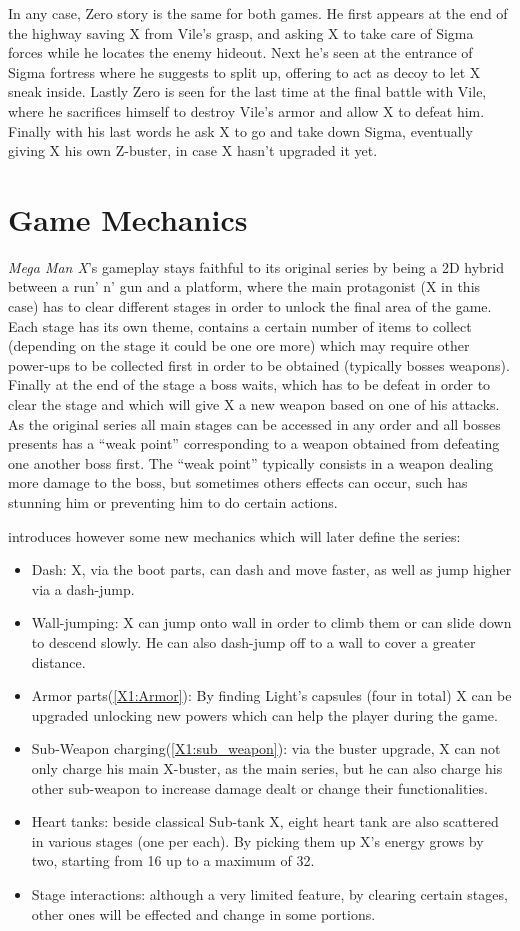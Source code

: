 In any case, Zero story is the same for both games. He first appears at the end of the highway saving X from Vile's grasp, and asking X to take care of Sigma forces while he locates the enemy hideout. Next he's seen at the entrance of Sigma fortress where he suggests to split up, offering to act as decoy to let X sneak inside. Lastly Zero is seen for the last time at the final battle with Vile, where he sacrifices himself to destroy Vile's armor and allow X to defeat him. Finally with his last words he ask X to go and take down Sigma, eventually giving X his own Z-buster, in case X hasn't upgraded it yet.
\section{Game Mechanics}
\textit{Mega Man X}'s gameplay stays faithful to its original series by being a 2D hybrid between a run' n' gun and a platform, where the main protagonist (X in this case) has to clear different stages in order to unlock the final area of the game. Each stage has its own theme, contains a certain number of items to collect (depending on the stage it could be one ore more) which may require other power-ups to be collected first in order to be obtained (typically bosses weapons). Finally at the end of the stage a boss waits, which has to be defeat in order to clear the stage and which will give X a new weapon based on one of his attacks. As the original series all main stages can be accessed in any order and all bosses presents has a ``weak point'' corresponding to a weapon obtained from defeating one another boss first. The ``weak point'' typically consists in a weapon dealing more damage to the boss, but sometimes others effects can occur, such has stunning him or preventing him to do certain actions.

\x introduces however some new mechanics which will later define the series\cite{wiki:X1_features}:
\begin{itemize}
	\item Dash: X, via the boot parts, can dash and move faster, as well as jump higher via a dash-jump.
	\item Wall-jumping: X can jump onto wall in order to climb them or can slide down to descend slowly. He can also dash-jump off to a wall to cover a greater distance.
	\item Armor parts(\ref{X1:Armor}): By finding Light's capsules (four in total) X can be upgraded unlocking new powers which can help the player during the game.
	\item Sub-Weapon charging(\ref{X1:sub_weapon}): via the buster upgrade, X can not only charge his main X-buster, as the main series, but he can also charge his other sub-weapon to increase damage dealt or change their functionalities.
	\item Heart tanks: beside classical Sub-tank X, eight heart tank are also scattered in various stages (one per each). By picking them up X's energy grows by two, starting from 16 up to a maximum of 32\cite{stratwiki:Heart_tank}.
	\item Stage interactions: although a very limited feature, by clearing certain stages, other ones will be effected and change in some portions.
\end{itemize}
